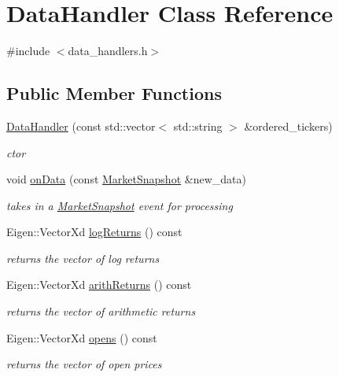 \hypertarget{classDataHandler}{}\section{Data\+Handler Class Reference}
\label{classDataHandler}


{\ttfamily \#include $<$data\+\_\+handlers.\+h$>$}

\subsection*{Public Member Functions}
\begin{DoxyCompactItemize}
\item 
\hyperlink{classDataHandler_a754e8043d3c0249833f9bf47dcfff4cd}{Data\+Handler} (const std\+::vector$<$ std\+::string $>$ \&ordered\+\_\+tickers)
\begin{DoxyCompactList}\small\item\em ctor \end{DoxyCompactList}\item 
void \hyperlink{classDataHandler_af90bc55472239836a8d071710356ceb7}{on\+Data} (const \hyperlink{classMarketSnapshot}{Market\+Snapshot} \&new\+\_\+data)
\begin{DoxyCompactList}\small\item\em takes in a \hyperlink{classMarketSnapshot}{Market\+Snapshot} event for processing \end{DoxyCompactList}\item 
Eigen\+::\+Vector\+Xd \hyperlink{classDataHandler_aed9c495d5134beaf1c796d5f828de229}{log\+Returns} () const
\begin{DoxyCompactList}\small\item\em returns the vector of log returns \end{DoxyCompactList}\item 
Eigen\+::\+Vector\+Xd \hyperlink{classDataHandler_a4d9a0013b6d2d3efa04e6e47b58b6eea}{arith\+Returns} () const
\begin{DoxyCompactList}\small\item\em returns the vector of arithmetic returns \end{DoxyCompactList}\item 
Eigen\+::\+Vector\+Xd \hyperlink{classDataHandler_a56ff111f68c862739bd94c193abdf400}{opens} () const
\begin{DoxyCompactList}\small\item\em returns the vector of open prices \end{DoxyCompactList}\item 

\end{DoxyCompactItemize}
